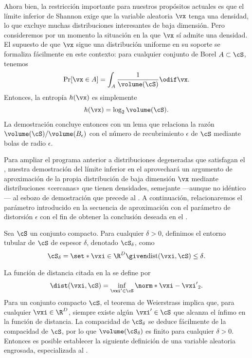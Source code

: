 \documentclass[../../book-main_es.tex]{subfiles}
\begin{document}
Ahora bien, la restricción importante para nuestros propósitos actuales es que el límite inferior de Shannon
exige que la variable aleatoria $\vx$ tenga una densidad, lo que excluye muchas
distribuciones interesantes de baja dimensión.
Pero consideremos por un momento la situación en la que $\vx$ sí admite una densidad.
El supuesto de que $\vx$ sigue una distribución uniforme en su soporte se formaliza fácilmente
en este contexto: para cualquier conjunto de Borel $A \subset \cS$, tenemos
\begin{equation}
    \Pr[\vx \in A] = \int_{A} \frac{1}{\volume(\cS)} \odif \vx.
\end{equation}
Entonces, la entropía $h(\vx)$ es simplemente
\begin{equation}
    h(\vx) = \log_2 \volume(\cS).
\end{equation}
La demostración concluye entonces con un lema que relaciona la razón $\volume(\cS)
/ \volume(B_{\epsilon})$ con el número de recubrimiento $\epsilon$ de $\cS$ mediante
bolas de radio $\epsilon$.

Para ampliar el programa anterior a distribuciones degeneradas que satisfagan el
,
nuestra demostración del límite inferior en el 
aprovechará un argumento de aproximación de la propia distribución de baja dimensión
$\vx$ mediante distribuciones «cercanas» que tienen
densidades, semejante —aunque no idéntico— al esbozo de demostración 
que precede al .
A continuación, relacionaremos el parámetro introducido en
la secuencia de aproximación con el parámetro de distorsión $\epsilon$ con el fin de
obtener la conclusión deseada en el .

\begin{definition}\label{def:thickening-set}
    Sea $\cS$ un conjunto compacto.
    Para cualquier $\delta > 0$, definimos el entorno tubular de $\cS$ de espesor $\delta$, denotado
    $\cS_{\delta}$, como
    \begin{equation}
        \cS_{\delta} = \set*{\vxi \in \R^D \given \mathrm{dist}(\vxi, \cS) \leq
        \delta}.
    \end{equation}
\end{definition}
La función de distancia citada en la  se define por
\begin{equation}\label{eq:dist-func}
    \dist(\vxi, \cS) = \inf_{\vxi' \in \cS} \norm*{\vxi - \vxi'}_2.
\end{equation}
Para un conjunto compacto $\cS$, el teorema de Weierstrass implica que, para cualquier $\vxi \in
\R^D$, siempre existe algún $\vxi' \in \cS$ que alcanza el ínfimo en
la función de distancia.
La compacidad de $\cS_{\delta}$ se deduce fácilmente de la compacidad de $\cS$, por lo que
$\volume(\cS_{\delta})$ es finito para cualquier $\delta > 0$. Entonces es posible
establecer la siguiente definición de una variable aleatoria engrosada, especializada al
.
\end{document}
